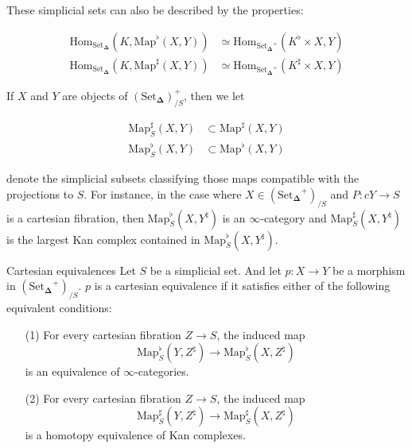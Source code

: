 \documentclass{beamer}[9pt]
\newcommand{\8}{\ensuremath{\infty}}
\newcommand{\SSet}{\ensuremath{\text{Set}_{\boldsymbol{\Delta}}}}
\newcommand{\Map}{\ensuremath{\text{Map}}}
\newcommand{\Hom}{\ensuremath{\text{Hom}}}
\begin{document}
\begin{frame}
  These simplicial sets can also be described by the properties:

  \begin{align*}
    \Hom_{\SSet}(K, \Map^\flat(X, Y))  & \simeq \Hom_{\SSet^+}(K^\flat\times X, Y)  \\
    \Hom_{\SSet}(K, \Map^\sharp(X, Y)) & \simeq \Hom_{\SSet^+}(K^\sharp\times X, Y)
  \end{align*}

  \pause

  If $X$ and $Y$ are objects of $(\SSet)^+_{/S}$, then we let

  \begin{align*}
    \Map_S^\sharp(X, Y) & \subset \Map^\sharp(X, Y) \\
    \Map_S^\flat(X, Y)  & \subset \Map^\flat(X, Y)
  \end{align*}

  denote the simplicial subsets classifying those maps compatible with the projections to $S$. For instance, in the case where $X \in (\SSet^+)_{/S}$ and $P: c Y \rightarrow S$ is a cartesian fibration, then $\Map^\flat_S(X, Y^\natural)$ is an \8-category and $\Map^\sharp_S(X, Y^\natural)$ is the largest Kan complex contained in $\Map^\flat_S(X, Y^\natural)$.
\end{frame}

\begin{frame}{Cartesian equivalences}
  Let $S$ be a simplicial set. And let $p: X \rightarrow Y$ be a morphism in $(\SSet^+)_{/S}$. $p$ is a cartesian equivalence if it satisfies either of the following equivalent conditions:
  \begin{itemize}
    \item[(1)] For every cartesian fibration $Z \rightarrow S$, the induced map
          $$
            \Map^\flat_S(Y, Z^\natural) \rightarrow \Map_S^\flat(X, Z^\natural)
          $$
          is an equivalence of \8-categories.
  \end{itemize}
\end{frame}

\begin{frame}
  \begin{itemize}
    \item[(2)] For every cartesian fibration $Z \rightarrow S$, the induced map
          $$
            \Map^\sharp_S(Y, Z^\natural) \rightarrow \Map_S^\sharp(X, Z^\natural)
          $$
          is a homotopy equivalence of Kan complexes.
  \end{itemize}
\end{frame}
\end{document}
